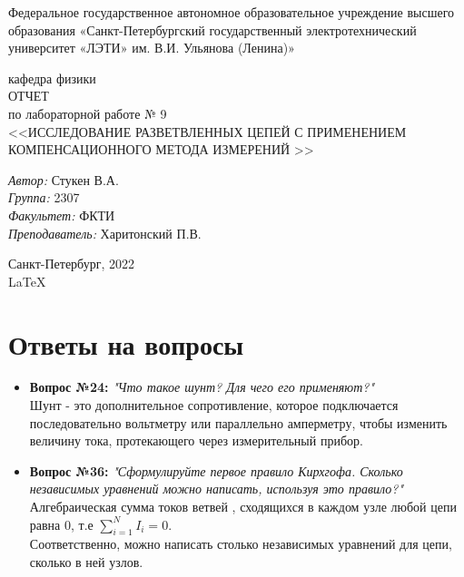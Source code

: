 \documentclass[a4paper,12pt]{report}
\begin{document}
 

\begin{titlepage} 

\begin{center} 

\large Федеральное государственное автономное образовательное учреждение высшего образования «Санкт-Петербургский государственный электротехнический университет «ЛЭТИ» им. В.И. Ульянова (Ленина)»
	
кафедра физики\\[5cm] 


\huge ОТЧЕТ\\ по лабораторной работе № 9\\[0.5cm] 
\large <<ИССЛЕДОВАНИЕ РАЗВЕТВЛЕННЫХ
ЦЕПЕЙ С ПРИМЕНЕНИЕМ КОМПЕНСАЦИОННОГО МЕТОДА
ИЗМЕРЕНИЙ 
>>\\[3.7cm]

\begin{minipage}{1\textwidth} 
    \begin{flushleft} 
        \emph{Автор:} Стукен В.А.\\
        \emph{Группа:} 2307\\
        \emph{Факультет:} ФКТИ\\
        \emph{Преподаватель:} Харитонский П.В. 
    \end{flushleft} 
\end{minipage} 

\vfill 

Санкт-Петербург, 2022\\
{\large \LaTeX} 

\end{center} 

\thispagestyle{empty} 
\end{titlepage} 


\newpage
\section*{Ответы на вопросы}

\begin{itemize}
    \item \textbf{Вопрос №24:}
    	\textit{"Что такое шунт? Для чего его применяют?"} \\
        Шунт - это дополнительное сопротивление, которое подключается последовательно вольтметру или параллельно амперметру, чтобы изменить величину тока, протекающего через измерительный прибор.
    \item \textbf{Вопрос №36:}
        \textit{"Сформулируйте первое правило Кирхгофа. Сколько независимых уравнений можно написать, используя это правило?"}
        Алгебраическая сумма токов ветвей , сходящихся в каждом узле любой цепи равна 0, т.е
         $\sum_{i = 1}^{N} I_i = 0$.
        \\ Соответственно, можно написать столько независимых уравнений для цепи, сколько в ней узлов.
        
\end{itemize}
\end{document}
